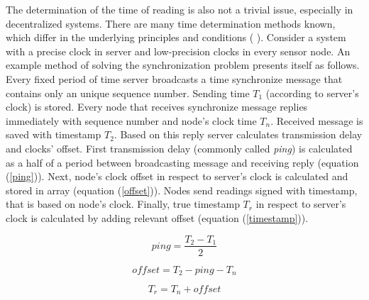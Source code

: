 The determination of the time of reading is also not a trivial issue, especially in decentralized systems. There are many time determination methods known, which differ in the underlying principles and conditions (\cite{time_sync} \cite{time_sync2}). Consider a system with a precise clock in server and low-precision clocks in every sensor node. An example method of solving the synchronization problem presents itself as follows. Every fixed period of time server broadcasts a time synchronize message that contains only an unique sequence number. Sending time $T_1$ (according to server's clock) is stored. Every node that receives synchronize message replies immediately with sequence number and node's clock time $T_n$. Received message is saved with timestamp $T_2$. Based on this reply server calculates transmission delay and clocks' offset. First transmission delay (commonly called \textit{ping}) is calculated as a half of a period between broadcasting message and receiving reply (equation (\ref{ping})). Next, node's clock offset in respect to server's clock is calculated and stored in array (equation (\ref{offset})). Nodes send readings signed with timestamp, that is based on node's clock. Finally, true timestamp $T_r$ in respect to server's clock is calculated by adding relevant offset (equation (\ref{timestamp})).

\begin{equation}
	ping = \frac{T_2 - T_1}{2}
	\label{ping}
\end{equation}

\begin{equation}
	offset = T_2 - ping - T_n
	\label{offset}
\end{equation}

\begin{equation}
	T_r = T_n + offset
	\label{timestamp}
\end{equation}